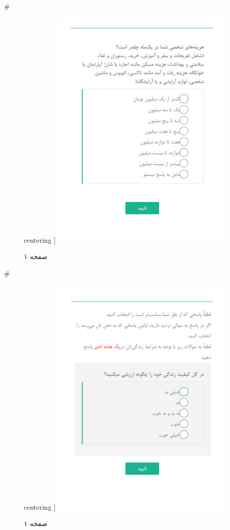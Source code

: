 { 
 # 
\begin{figure}[htpb]
centering ]
\includegraphics[width=0.8\textwidth]{./img/Task14.png/}
\caption{صفحه ۱}
\label{fig:Task1}
\end{figure}
 
 
 # 
\begin{figure}[htpb]
centering ]
\includegraphics[width=0.8\textwidth]{./img/Task15.png/}
\caption{صفحه ۱}
\label{fig:Task1}
\end{figure}
 
}
